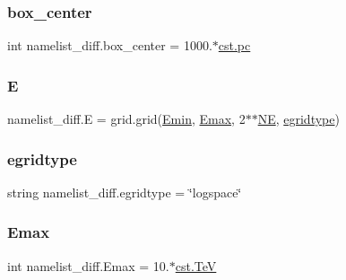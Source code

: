 \subsubsection{\texorpdfstring{box\+\_\+center}{box\_center}}
{\footnotesize\ttfamily int namelist\+\_\+diff.\+box\+\_\+center = 1000.$\ast$\hyperlink{constants_8h_a2884cd030c4c825754349a525a1d06ce}{cst.\+pc}}

\mbox{\label{namespacenamelist__diff_ae68d844b18a3d2bd16481352a89c7477}} 
\subsubsection{\texorpdfstring{E}{E}}
{\footnotesize\ttfamily namelist\+\_\+diff.\+E = grid.\+grid(\hyperlink{namespacenamelist__diff_aafc262ff32658f44f1086b13486f3884}{Emin}, \hyperlink{namespacenamelist__diff_addaaa575c316acdbc3af9898fc68fa14}{Emax}, 2$\ast$$\ast$\hyperlink{namespacenamelist__diff_ab7da180f3c9b27543568db4cb02b362a}{NE}, \hyperlink{namespacenamelist__diff_a7f4e3a990587cf5a897b0aa0c6f405a2}{egridtype})}

\mbox{\label{namespacenamelist__diff_a7f4e3a990587cf5a897b0aa0c6f405a2}} 
\subsubsection{\texorpdfstring{egridtype}{egridtype}}
{\footnotesize\ttfamily string namelist\+\_\+diff.\+egridtype = \char`\"{}logspace\char`\"{}}

\mbox{\label{namespacenamelist__diff_addaaa575c316acdbc3af9898fc68fa14}} 
\subsubsection{\texorpdfstring{Emax}{Emax}}
{\footnotesize\ttfamily int namelist\+\_\+diff.\+Emax = 10.$\ast$\hyperlink{constants_8h_a7f801e1f6821bc6baf0652ed2496e5e9}{cst.\+TeV}}

\mbox{\label{namespacenamelist__diff_aafc262ff32658f44f1086b13486f3884}} 
